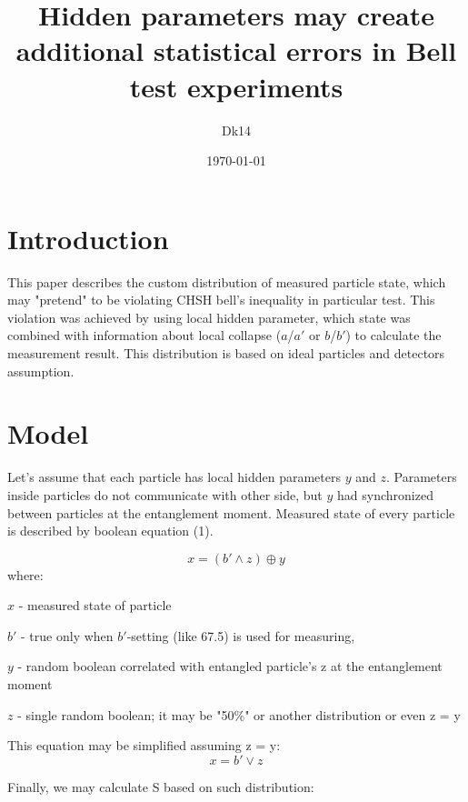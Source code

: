 \documentclass[a4paper]{article}
\title{Hidden parameters may create additional statistical errors in Bell test experiments}
\author{Dk14}
\date{\today}
\begin{document}
\maketitle



\section{Introduction}

This paper describes the custom distribution of measured particle state, which may "pretend" to be violating CHSH bell's inequality in particular test. This violation was achieved by using local hidden parameter, which state was combined with information about local collapse ($a$/$a'$ or $b$/$b'$) to calculate the measurement result. This distribution is based on ideal particles and detectors assumption.

\section{Model}
\label{sec:examples}


Let's assume that each particle has local hidden parameters $y$ and $z$. Parameters inside particles do not communicate with other side, but $y$ had  synchronized between particles at the entanglement moment. Measured state of every particle is described by boolean equation (1).

\begin{equation}
x = (b' \land z) \oplus y
\end{equation}
where:

    $x$ - measured state of particle
  
    $b'$ - true only when $b'$-setting (like 67.5) is used for measuring,
    
    $y$ - random boolean correlated with entangled particle's z at the entanglement moment
    
    $z$ - single random boolean; it may be "50\%" or another distribution or even z = y
    
\hspace{0pt} 

This equation may be simplified assuming z = y:
\begin{equation}
x = b' \lor z
\end{equation}
\hspace{0pt}        

Finally, we may calculate S based on such distribution:
\end{document}

